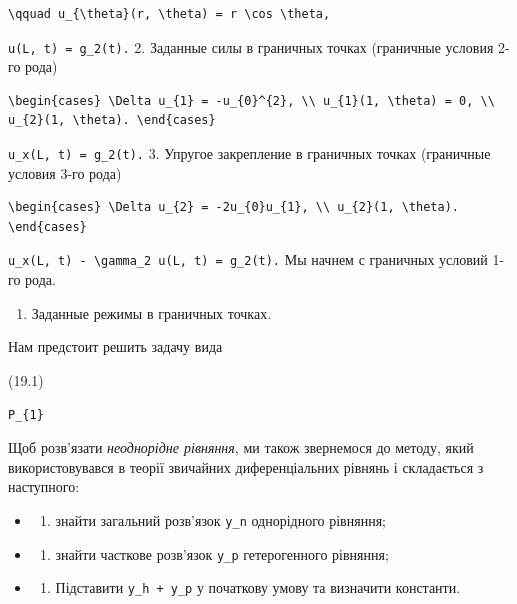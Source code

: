 \documentclass[
  ukrainian,
]{article}
\providecommand{\tightlist}{%
  \setlength{\itemsep}{0pt}\setlength{\parskip}{0pt}}
\begin{document}
\begin{verbatim}
\qquad u_{\theta}(r, \theta) = r \cos \theta,
\end{verbatim}

\texttt{u(L,\ t)\ =\ g\_2(t).} 2. Заданные силы в граничных точках
(граничные условия 2-го рода)

\begin{verbatim}
\begin{cases} \Delta u_{1} = -u_{0}^{2}, \\ u_{1}(1, \theta) = 0, \\ u_{2}(1, \theta). \end{cases}
\end{verbatim}

\texttt{u\_x(L,\ t)\ =\ g\_2(t).} 3. Упругое закрепление в граничных
точках (граничные условия 3-го рода)

\begin{verbatim}
\begin{cases} \Delta u_{2} = -2u_{0}u_{1}, \\ u_{2}(1, \theta). \end{cases}
\end{verbatim}

\texttt{u\_x(L,\ t)\ -\ \textbackslash{}gamma\_2\ u(L,\ t)\ =\ g\_2(t).}
Мы начнем с граничных условий 1-го рода.

\begin{enumerate}
\def\labelenumi{\arabic{enumi}.}
\tightlist
\item
  Заданные режимы в граничных точках.
\end{enumerate}

Нам предстоит решить задачу вида

(19.1)

\begin{verbatim}
P_{1}
\end{verbatim}

Щоб розв'язати \emph{неоднорідне рівняння}, ми також звернемося до
методу, який використовувався в теорії звичайних диференціальних рівнянь
і складається з наступного:

\begin{itemize}
\tightlist
\item
  \begin{enumerate}
  \def\labelenumi{\arabic{enumi})}
  \tightlist
  \item
    знайти загальний розв'язок \texttt{y\_n} однорідного рівняння;
  \end{enumerate}
\item
  \begin{enumerate}
  \def\labelenumi{\arabic{enumi})}
  \setcounter{enumi}{1}
  \tightlist
  \item
    знайти часткове розв'язок \texttt{y\_p} гетерогенного рівняння;
  \end{enumerate}
\item
  \begin{enumerate}
  \def\labelenumi{\arabic{enumi})}
  \setcounter{enumi}{2}
  \tightlist
  \item
    Підставити \texttt{y\_h\ +\ y\_p} у початкову умову та визначити
    константи.
  \end{enumerate}
\end{itemize}
\end{document}
